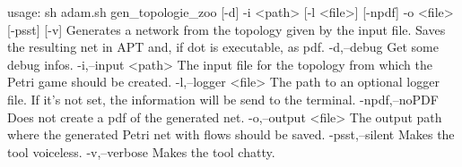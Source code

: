 usage: sh adam.sh gen_topologie_zoo [-d] -i <path> [-l <file>] [-npdf] -o
       <file> [-psst] [-v]
Generates a network from the topology given by the input file. Saves the
resulting net in APT and, if dot is executable, as pdf.
 -d,--debug           Get some debug infos.
 -i,--input <path>    The input file for the topology from which the Petri
                      game should be created.
 -l,--logger <file>   The path to an optional logger file. If it's not
                      set, the information will be send to the terminal.
 -npdf,--noPDF        Does not create a pdf of the generated net.
 -o,--output <file>   The output path where the generated Petri net with
                      flows should be saved.
 -psst,--silent       Makes the tool voiceless.
 -v,--verbose         Makes the tool chatty.
